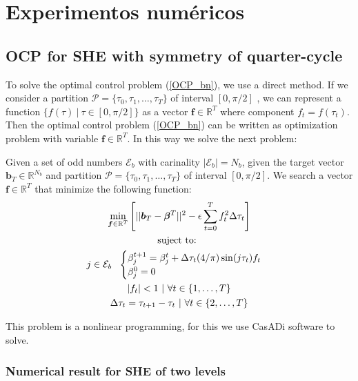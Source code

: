 \section{Experimentos numéricos}

\subsection{OCP for SHE with symmetry of quarter-cycle}
To solve the optimal control problem (\ref{OCP_bn}), we use a direct method. 
If we consider a partition $\mathcal{P} = \{\tau_0,\tau_1,\dots,\tau_{T}\}$ of interval $[0,\pi/2]$ , we can represent a function $\{ f(\tau) \ | \ \tau \in [0,\pi/2]\}$ as a vector $\bm{f} \in \mathbb{R}^{T}$ where component $f_t = f(\tau_t)$. Then the optimal control problem (\ref{OCP_bn}) can be written as optimization problem with variable $\bm{f} \in \mathbb{R}^{T}$. In this way we solve the next problem:

\begin{problem}
    Given  a set of odd numbers $\mathcal{E}_b$ with carinality $|\mathcal{E}_b| = N_b$, given the target vector $\bm{b}_T  \in \mathbb{R}^{N_b}$ and  partition $\mathcal{P} = \{\tau_0,\tau_1,\dots,\tau_{T}\}$ of interval $[0,\pi/2]$. We search a vector $\bm{f} \in \mathbb{R}^{T}$ that minimize the following function:
    \begin{gather}
        \min_{\bm{f} \in \mathbb{R}^{T} } \Bigg[ || \bm{b}_T - \bm{\beta}^{T}||^2 - \epsilon  \sum_{t=0}^{T} f_{t}^2 \Delta\tau_t  \Bigg]  \\
        \notag \text{suject to: } \\
        \notag j \in \mathcal{E}_b \ \ 
        \begin{cases}
            \beta_j^{t+1} = \beta_j^{t} + \Delta \tau_t (4/\pi) \sin(j\tau_t) f_t \\
            \beta_j^0 = 0
        \end{cases} \\
        \notag |f_t| < 1 \ | \ \forall t \in \{1,\dots,T\} \\
        \Delta \tau_t = \tau_{t+1} - \tau_{t} \ | \ \forall t \in \{2,\dots,T\}
    \end{gather}
\end{problem}

This problem is a nonlinear programming, for this we use CasADi software to solve.

\subsubsection{Numerical result for SHE of two levels}

